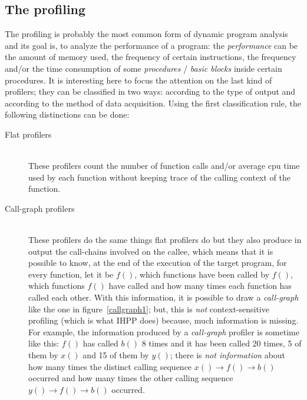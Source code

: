\documentclass[a4paper,10pt]{report}
\begin{document}
\subsection{The profiling}
The profiling is probably the most common form of dynamic program analysis and
its goal is, to analyze the performance of a program: the
\emph{performance} can be the amount of memory used, the frequency of certain
instructions, the frequency and/or the time consumption of some
\emph{procedures} / \emph{basic blocks} inside certain procedures.
It is interesting here to focus the attention on the last kind of profilers;
they can be classified in two ways: according to the type of output and according to the method of data acquisition. Using the first classification rule, the following distinctions can be done:

\begin{description}
\item[Flat profilers] \hfill \\
These profilers count the number of function calls and/or average cpu time used
by each function without keeping trace of the calling context of the function.
\item[Call-graph profilers] \hfill \\
These profilers do the same things flat profilers do but they also produce in output
the call-chains involved on the callee, which means that it is possible to know,
at the end of the execution of the target program, for every function, let it be
$f()$, which functions have been called by $f()$, which functions $f()$ have called and how many times each function has called each other. With this
information, it is possible to draw a
\emph{call-graph} like the one in figure~\ref{callgraph1}; but, this is
\emph{not} context-sensitive profiling (which is what IHPP does) because,
much information is missing.
For example, the information produced by a \emph{call-graph} profiler
is sometime like this: $f()$ has called $b()$ 8 times and it has been called 20
times, 5 of them by $x()$ and 15 of them by $y()$; there is \emph{not information} about how many times the distinct calling sequence $x()\rightarrow f()\rightarrow b()$ occurred and how
many times the other calling sequence $y()\rightarrow f()\rightarrow b()$
occurred.

\begin{figure}

\begin{center}

\begin{tikzpicture}
[->,>=stealth',shorten >=1pt,
node distance=1.5cm,
minimum size=7mm,
main node/.style={circle, draw, font=\itshape\large}]


\end{tikzpicture}
\end{center}
\end{figure}
\end{description}
\end{document}
